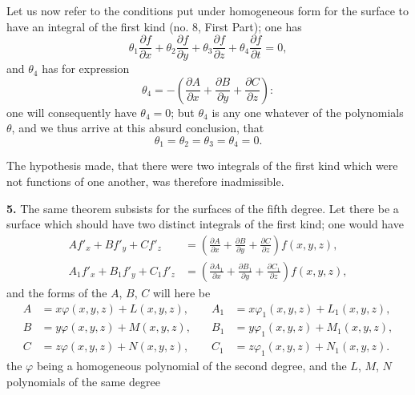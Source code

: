 \documentclass{article}
\begin{document}
Let us now refer to the conditions put under homogeneous form for the surface to have an integral of the first kind (no. 8, First Part); one has
\[
\theta_{1}\frac{\partial f}{\partial x} + \theta_{2}\frac{\partial f}{\partial y} + \theta_{3}\frac{\partial f}{\partial z} + \theta_{4}\frac{\partial f}{\partial t} = 0,
\]
and $\theta_{4}$ has for expression
\[
\theta_{4} = -\left(\frac{\partial A}{\partial x} + \frac{\partial B}{\partial y} + \frac{\partial C}{\partial z}\right):
\]
one will consequently have $\theta_{4} = 0$; but $\theta_{4}$ is any one whatever of the polynomials $\theta$, and we thus arrive at this absurd conclusion, that
\[
\theta_{1} = \theta_{2} = \theta_{3} = \theta_{4} = 0.
\]

The hypothesis made, that there were two integrals of the first kind which were not functions of one another, was therefore inadmissible.


\textbf{5.} The same theorem subsists for the surfaces of the fifth degree. Let there be a surface which should have two distinct integrals of the first kind; one would have
\[
\begin{aligned}
Af'_{x} + Bf'_{y} + Cf'_{z} &= \left(\frac{\partial A}{\partial x} + \frac{\partial B}{\partial y} + \frac{\partial C}{\partial z}\right) f(x, y, z), \\
A_{1}f'_{x} + B_{1}f'_{y} + C_{1}f'_{z} &= \left(\frac{\partial A_{1}}{\partial x} + \frac{\partial B_{1}}{\partial y} + \frac{\partial C_{1}}{\partial z}\right) f(x, y, z),
\end{aligned}
\tag{1}
\]
and the forms of the $A$, $B$, $C$ will here be
\[
\begin{aligned}
A &= x\varphi(x, y, z) + L(x, y, z), &\quad A_{1} &= x\varphi_{1}(x, y, z) + L_{1}(x, y, z), \\
B &= y\varphi(x, y, z) + M(x, y, z), &\quad B_{1} &= y\varphi_{1}(x, y, z) + M_{1}(x, y, z), \\
C &= z\varphi(x, y, z) + N(x, y, z), &\quad C_{1} &= z\varphi_{1}(x, y, z) + N_{1}(x, y, z).
\end{aligned}
\]
the $\varphi$ being a homogeneous polynomial of the second degree, and the $L$, $M$, $N$ polynomials of the same degree
\end{document}
